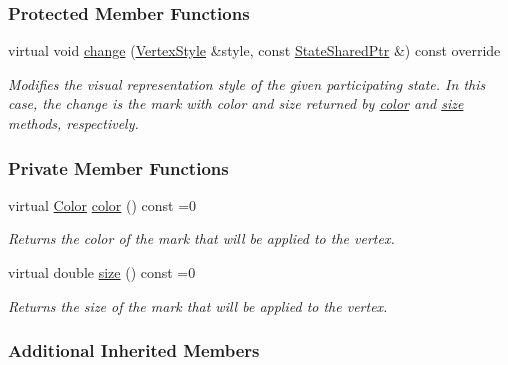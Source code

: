 \subsubsection*{Protected Member Functions}
\begin{DoxyCompactItemize}
\item 
virtual void \hyperlink{structVertexEmphasis_aa61501cea1d2adc70c5780c9bd69fe2d}{change} (\hyperlink{structVertexStyle}{Vertex\+Style} \&style, const \hyperlink{structEventBase_a2c0edb5cda08ce1965f3440a97b3fc87}{State\+Shared\+Ptr} \&) const override\hypertarget{structVertexEmphasis_aa61501cea1d2adc70c5780c9bd69fe2d}{}\label{structVertexEmphasis_aa61501cea1d2adc70c5780c9bd69fe2d}

\begin{DoxyCompactList}\small\item\em Modifies the visual representation style of the given participating state. In this case, the change is the mark with color and size returned by \hyperlink{structVertexEmphasis_a816cd9c7fde4df145cb35ff66b8fc32b}{color} and \hyperlink{structVertexEmphasis_a581aad15b87c3a633a569f43380c7e5c}{size} methods, respectively. \end{DoxyCompactList}\end{DoxyCompactItemize}
\subsubsection*{Private Member Functions}
\begin{DoxyCompactItemize}
\item 
virtual \hyperlink{colors_8h_ab87bacfdad76e61b9412d7124be44c1c}{Color} \hyperlink{structVertexEmphasis_a816cd9c7fde4df145cb35ff66b8fc32b}{color} () const =0
\begin{DoxyCompactList}\small\item\em Returns the color of the mark that will be applied to the vertex. \end{DoxyCompactList}\item 
virtual double \hyperlink{structVertexEmphasis_a581aad15b87c3a633a569f43380c7e5c}{size} () const =0
\begin{DoxyCompactList}\small\item\em Returns the size of the mark that will be applied to the vertex. \end{DoxyCompactList}\end{DoxyCompactItemize}
\subsubsection*{Additional Inherited Members}


